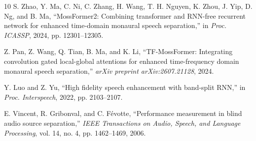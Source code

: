\documentclass[conference]{IEEEtran}
\begin{document}
\begin{thebibliography}{10}
S. Zhao, Y. Ma, C. Ni, C. Zhang, H. Wang, T. H. Nguyen, K. Zhou, J. Yip, D. Ng, and B. Ma, ``MossFormer2: Combining transformer and RNN-free recurrent network for enhanced time-domain monaural speech separation,'' in \textit{Proc. ICASSP}, 2024, pp. 12301--12305.

Z. Pan, Z. Wang, Q. Tian, B. Ma, and K. Li, ``TF-MossFormer: Integrating convolution gated local-global attentions for enhanced time-frequency domain monaural speech separation,'' \textit{arXiv preprint arXiv:2607.21128}, 2024.

Y. Luo and Z. Yu, ``High fidelity speech enhancement with band-split RNN,'' in \textit{Proc. Interspeech}, 2022, pp. 2103--2107.

E. Vincent, R. Gribonval, and C. Févotte, ``Performance measurement in blind audio source separation,'' \textit{IEEE Transactions on Audio, Speech, and Language Processing}, vol. 14, no. 4, pp. 1462--1469, 2006.

\end{thebibliography}
\end{document}
